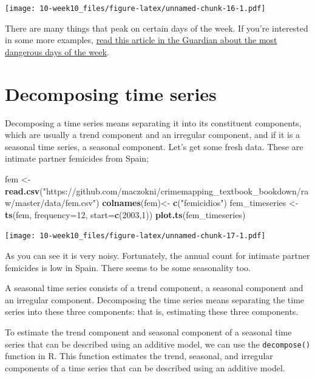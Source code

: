 \documentclass[]{book}
\newenvironment{Shaded}{\begin{snugshade}}{\end{snugshade}}
\newcommand{\DataTypeTok}[1]{\textcolor[rgb]{0.13,0.29,0.53}{#1}}
\newcommand{\DecValTok}[1]{\textcolor[rgb]{0.00,0.00,0.81}{#1}}
\newcommand{\KeywordTok}[1]{\textcolor[rgb]{0.13,0.29,0.53}{\textbf{#1}}}
\newcommand{\NormalTok}[1]{#1}
\newcommand{\StringTok}[1]{\textcolor[rgb]{0.31,0.60,0.02}{#1}}
\begin{document}
\texttt{[image: 10-week10\_files/figure-latex/unnamed-chunk-16-1.pdf]}

There are many things that peak on certain days of the week. If you're interested in some more examples, \href{https://www.theguardian.com/lifeandstyle/2013/may/29/most-dangerous-day-of-week}{read this article in the Guardian about the most dangerous days of the week}.

\hypertarget{decomposing-time-series}{%
\section{Decomposing time series}\label{decomposing-time-series}}

Decomposing a time series means separating it into its constituent components, which are usually a trend component and an irregular component, and if it is a seasonal time series, a seasonal component. Let's get some fresh data. These are intimate partner femicides from Spain;

\begin{Shaded}
\begin{Highlighting}[]
\NormalTok{fem <-}\StringTok{ }\KeywordTok{read.csv}\NormalTok{(}\StringTok{"https://github.com/maczokni/crimemapping_textbook_bookdown/raw/master/data/fem.csv"}\NormalTok{)}
\KeywordTok{colnames}\NormalTok{(fem)<-}\StringTok{ }\KeywordTok{c}\NormalTok{(}\StringTok{"femicidios"}\NormalTok{)}
\NormalTok{fem_timeseries <-}\StringTok{ }\KeywordTok{ts}\NormalTok{(fem, }\DataTypeTok{frequency=}\DecValTok{12}\NormalTok{, }\DataTypeTok{start=}\KeywordTok{c}\NormalTok{(}\DecValTok{2003}\NormalTok{,}\DecValTok{1}\NormalTok{))}
\KeywordTok{plot.ts}\NormalTok{(fem_timeseries)}
\end{Highlighting}
\end{Shaded}

\texttt{[image: 10-week10\_files/figure-latex/unnamed-chunk-17-1.pdf]}

As you can see it is very noisy. Fortunately, the annual count for intimate partner femicides is low in Spain. There seems to be some seasonality too.

A seasonal time series consists of a trend component, a seasonal component and an irregular component. Decomposing the time series means separating the time series into these three components: that is, estimating these three components.

To estimate the trend component and seasonal component of a seasonal time series that can be described using an additive model, we can use the \texttt{decompose()} function in R. This function estimates the trend, seasonal, and irregular components of a time series that can be described using an additive model.
\end{document}
